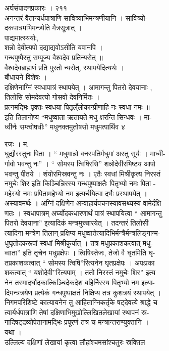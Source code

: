 \documentclass[11pt, openany]{book}
\begin{document}
{{{{{{{{{{{{{{ अर्घसंपादनप्रकारः । २११}{\\
अनन्तरं वैतान्यर्धपात्राणि सावित्र्याभिमन्त्रणीयानि । सावित्र्यो-\\
दकपात्रमभिमन्त्र्येति मैत्रसूत्रात् ।\\
पाद्यमात्स्ययोः,\\
शन्नो देवीत्यपो दद्याद्यवोऽसीति यवानपि ।\\
गन्धपुष्पैस्तु सम्पूज्य वैश्वदेव प्रतिन्यसेत् ॥\\
वैश्वदेवब्राह्मणं प्रति पुरतो न्यसेत्, स्थापयेदित्यर्थः ।\\
बौधायने विशेषः ।\\
दक्षिणेनाग्निं स्वधापात्रं स्थापयेत् । आमागन्तु पितरो देवयानाः ,\\
तिलोसि सोमदेवत्यो गोसवो देवनिर्मितः ।\\
प्रत्नमद्भिः पृक्तः स्वधया पितृल्ँलोकान्प्रीणाहि नः स्वधा नमः ॥\\
इति तिलानोप्य ``मधुष्वाता ऋतायते मधु क्षरन्ति सिन्धवः । मा-\\
ध्वीर्नः सम्त्वोषधीः'' मधुनक्तमुतोषसो मधुमत्पार्थिव }{४ }{रजः । म.\\
धुद्यौरस्तुनः पिता । `` मधुमान्नो वनस्पतिर्मधुमां अस्तु सूर्यः ।
माध्वी-\\
र्गावो भवन्तु नः'' । `` सोमस्य त्विषिरसि'' शन्नोदेवीरभिष्टय आपो\\
भवन्तु पीतये । शंयोरमिस्रवन्तु नः । एतैः स्वधां मिश्रीकृत्य
निरस्तं\\
नमुचेः शिर इति किञ्चिन्निरस्य गन्धपुष्पाक्षतैः पितृभ्यो नमः पिता -\\
महेस्यो नमः प्रपितामहेभ्यो नम इत्यर्चयित्वा दर्भैः प्रस्थापयेत् ।\\
अस्यावमर्थः । अग्निं दक्षिणेन अन्वाहार्यपचनस्यावसथ्यस्य वामेर्दक्षि\\
णतः । स्वधापात्रम् अर्घ्योदकधारणार्थं पात्रं स्थापयित्वा `` आमागन्तु\\
पितरो देवयाना'' इत्यादिकं मन्त्रमुच्चारयेत् । तदन्तरं तिलोसी\\
त्यादिना मन्त्रेण तिलान् प्रक्षिप्य
मधुव्वातेत्यादिभिर्मन्त्रैर्मन्त्रलिङ्गान्म-\\
धुघृतोदकरूपां स्वधां मिश्रीकुर्यात् । तत्र मधुप्रकाशकत्वात् मधु-\\
व्वाता'' इति तृचेन मधुप्रक्षेपः । त्विषिस्तेजः, तेजो वै घृतमिति घृ-\\
तप्रकाशकत्वात् `` सोमस्य त्विषि''रित्यनेन घृतप्रक्षेपः । अपःप्रका\\
शकत्वात् `` यशोदेवी''रित्यपाम् । ततो निरस्तं नमुचेः शिर'' इत्य\\
नेन तस्मादर्घौदकात्किञ्चिदेकदेश बहिर्निरस्य पितृभ्यो नम इत्या-\\
दिमन्त्रत्रयेण प्रत्येकं गन्धपुष्पाक्षतं निक्षिप्य तत्र कुशत्रयं
स्थापयेत् ।\\
निगमपरिशिष्टे कात्यायनेन तु आहिताग्निकर्तृके षट्देवत्ये श्राद्धे च\\
त्वार्यर्धपात्राणि तेषां दक्षिणाभिमुखोल्लिखितलेखायां स्थापनं स्र-\\
गादिषट्द्रव्योपेतानामद्भिः प्रपूरणं तत्र च मन्त्रान्तराण्युक्तानि ।\\
यथा ।\\
उल्लिल्य दक्षिणां लेखायां कृत्वा लौहांश्चमसांश्चतुरः स्रक्तिल

}}}}}}}}}}}}}}
\end{document}
